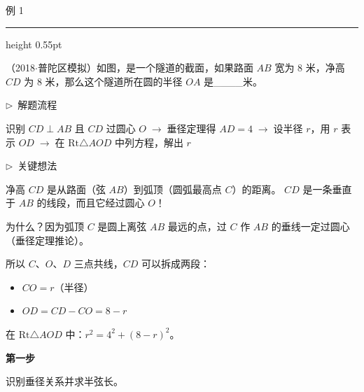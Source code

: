 \documentclass{exam-zh}
\newcommand{\edukai}{\kaishu}
\newenvironment{eduSubQuestionItem}[1]{%
  \needspace{4\baselineskip}%
  \vspace{2mm}
  \par\noindent
  \hangindent=8mm\hangafter=1
  {\color{edu-blue}\bfseries #1}\enspace
  \begingroup
  \color{edu-ink}
}{%
  \endgroup
  \par
  \vspace{3mm}
}
\newenvironment{eduAuxItem}[1]{%
  \needspace{4\baselineskip}%
  \vspace{2mm}
  \par\noindent
  \hangindent=8mm\hangafter=1
  {\color{edu-blue}\edukai $\triangleright$~#1}\enspace
  \begingroup
  \color{edu-ink}
  \edukai
}{%
  \endgroup
  \par
  \vspace{4mm}
}
\newenvironment{eduProblemBlock}[1][题目]{%
  \needspace{8\baselineskip}
  {\small\color{edu-muted}#1}\par
  \vspace{1.5mm}
  {\color{edu-blue}\hrule height 0.55pt}
  \vspace{4.5mm}
  \begingroup
  \color{edu-ink}
  \large
  \setlength{\parskip}{2.2mm}
  \linespread{1.20}\selectfont
}{%
  \par
  \endgroup
  \vspace{6mm}
}
\begin{document}
\begin{eduProblemBlock}[例 1]
（2018$\cdot$普陀区模拟）如图，是一个隧道的截面，如果路面 $AB$ 宽为 $8$ 米，净高 $CD$ 为 $8$ 米，那么这个隧道所在圆的半径 $OA$ 是\_\_\_\_米。
\end{eduProblemBlock}









\begin{eduAuxItem}{解题流程}
识别 $CD \perp AB$ 且 $CD$ 过圆心 $O$$\;\to\;$垂径定理得 $AD = 4$$\;\to\;$设半径 $r$，用 $r$ 表示 $OD$$\;\to\;$在 $\mathrm{Rt}\triangle AOD$ 中列方程，解出 $r$\end{eduAuxItem}




\begin{eduAuxItem}{关键想法}
净高 $CD$ 是从路面（弦 $AB$）到弧顶（圆弧最高点 $C$）的距离。
$CD$ 是一条垂直于 $AB$ 的线段，而且它经过圆心 $O$！

为什么？因为弧顶 $C$ 是圆上离弦 $AB$ 最远的点，过 $C$ 作 $AB$ 的垂线一定过圆心（垂径定理推论）。

所以 $C$、$O$、$D$ 三点共线，$CD$ 可以拆成两段：
\begin{itemize}
  \item $CO = r$（半径）
  \item $OD = CD - CO = 8 - r$
\end{itemize}
在 $\mathrm{Rt}\triangle AOD$ 中：$r^2 = 4^2 + (8-r)^2$。
\end{eduAuxItem}




\begin{eduSubQuestionItem}{第一步}
识别垂径关系并求半弦长。\end{eduSubQuestionItem}
\end{document}

